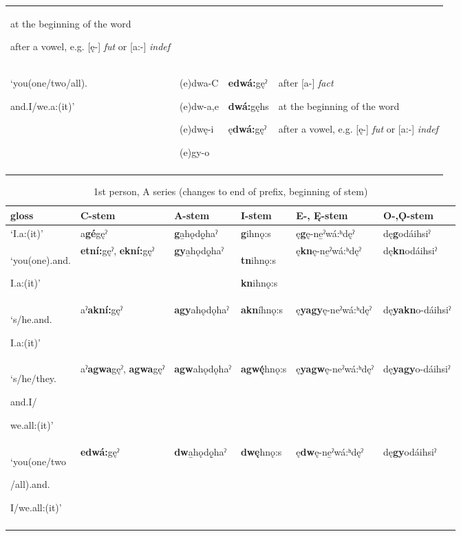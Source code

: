 \begin{table}
{\begin{tabularx}{\textwidth}{XXXX}
at the beginning of the word 

after a vowel, e.g. [ę-] \textit{fut} or [a:-] \textit{indef}\\
‘you(one/two/all).

and.I/we.a:(it)’ & (e)dwa-C

(e)dw-a,e

(e)dwę-i

(e)gy-o & \textbf{edwá:}gęˀ

\textbf{dwá:}gęhs

ę\textbf{dwá:}gęˀ & after [a-] \textit{fact}

at the beginning of the word 

after a vowel, e.g. [ę-] \textit{fut} or [a:-] \textit{indef}\\
\lspbottomrule
\end{tabularx}}
\end{table}

\begin{table}
\caption{1st person, A series (changes to end of prefix, beginning of stem)}
\label{tab:1:1apron2}
\tiny{
\begin{tabularx}{\textwidth}{XXXXXX}
\lsptoprule
gloss & C-stem & A-stem & I-stem & E-, Ę{}-stem & O-,Ǫ{}-stem\\
\midrule
‘I.a:(it)’ & a\textbf{gé}gęˀ & \textbf{g}a̱hǫdǫ̱haˀ & \textbf{g}ihnǫ:s & ę\textbf{g}ę-ne̱ˀwá:ʰdęˀ & dę\textbf{g}odáihsiˀ\\
‘you(one).and.

I.a:(it)’ & \textbf{etní:}gęˀ, \textbf{ekní:}gęˀ & \textbf{gy}a̱hǫdǫ̱haˀ & \textbf{tn}ihnǫ:s

\textbf{kn}ihnǫ:s & ę\textbf{kn}ę-ne̱ˀwá:ʰdęˀ & dę\textbf{kn}odáihsiˀ\\
‘s/he.and.

I.a:(it)’ & aˀ\textbf{akní:}gęˀ & \textbf{agy}ahǫdǫhaˀ & \textbf{akn}íhnǫ:s & ę\textbf{yagy}ę-neˀwá:ʰdęˀ & dę\textbf{yakn}o-dáihsiˀ\\
‘s/he/they.

and.I/

we.all:(it)’ & aˀ\textbf{agwa}gęˀ, \textbf{agwa}gęˀ & \textbf{agw}ahǫdǫhaˀ & \textbf{agw\'{ę}}hnǫ:s & ę\textbf{yagw}ę-neˀwá:ʰdęˀ & dę\textbf{yagy}o-dáihsiˀ\\
‘you(one/two

/all).and.

I/we.all:(it)’ & \textbf{edwá:}gęˀ & \textbf{dw}a̱hǫdǫ̱haˀ & \textbf{dwę}hnǫ:s & ę\textbf{dw}ę-ne̱ˀwá:ʰdęˀ & dę\textbf{gy}odáihsiˀ\\
\lspbottomrule
\end{tabularx}}
\end{table}



